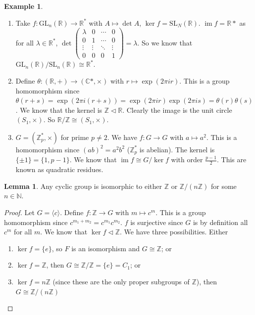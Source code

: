 \documentclass[a4paper]{article}
\theoremstyle{definition}
\newtheorem*{eg}{Example}
\newtheorem*{lemma}{Lemma}
\newcommand{\N}{\mathbb{N}}
\newcommand{\Z}{\mathbb{Z}}
\newcommand{\R}{\mathbb{R}}
\newcommand{\C}{\mathbb{C}}
\newcommand{\bra}{\langle}
\newcommand{\ket}{\rangle}
\newcommand{\GL}{\mathrm{GL}}
\newcommand{\SL}{\mathrm{SL}}
\DeclareMathOperator\im{im}
\begin{document}
\begin{eg}\leavevmode
  \begin{enumerate}
  \item Take $f: \GL_n(\R) \to \R^*$ with $A \mapsto \det A$, $\ker f = \SL_N(\R)$. $\im f = \R*$ as for all $\lambda \in \R^*$, $\det 
    \begin{pmatrix}
      \lambda & 0 & \cdots & 0 \\
      0 &1 & \cdots & 0\\
      \vdots &\vdots &\ddots & \vdots\\
      0& 0 & 0 &1
    \end{pmatrix}
     = \lambda$. So we know that $\GL_n(\R)/\SL_n(\R) \cong \R^*$.
  \item Define $\theta: (\R, +) \to (\C*, \times)$ with $r\mapsto \exp(2\pi ir)$. This is a group homomorphism since $\theta(r + s) = \exp(2\pi i(r + s)) = \exp (2\pi i r)\exp (2\pi i s) = \theta(r)\theta(s)$. We know that the kernel is $\Z\lhd \R$. Clearly the image is the unit circle $(S_1, \times)$. So $\R/\Z \cong (S_1, \times)$.
  \item $G = (\Z_p^*, \times)$ for prime $p\not= 2$. We have $f: G\to G$ with $a\mapsto a^2$. This is a homomorphism since $(ab)^2 = a^2b^2$ ($\Z_p^*$ is abelian). The kernel is $\{\pm 1\} = \{1, p - 1\}$. We know that $\im f\cong G/\ker f$ with order $\frac{p - 1}{2}$. This are known as quadratic residues. 
  \end{enumerate}
\end{eg}

\begin{lemma}
  Any cyclic group is isomorphic to either $\Z$ or $\Z/(n\Z)$ for some $n\in \N$.
\end{lemma}

\begin{proof}
  Let $G = \bra c\ket$. Define $f: \Z \to G$ with $m\mapsto c^m$. This is a group homomorphism since $c^{m_1 + m_2} = c^{m_1}c^{m_2}$. $f$ is surjective since $G$ is by definition all $c^m$ for all $m$. We know that $\ker f\lhd \Z$. We have three possibilities. Either
  \begin{enumerate}
  \item $\ker f = \{e\}$, so $F$ is an isomorphism and $G\cong \Z$; or
  \item $\ker f = \Z$, then $G\cong \Z/\Z = \{e\} = C_1$; or
  \item $\ker f = n\Z$ (since these are the only proper subgroups of $\Z$), then $G\cong \Z/(n\Z)$
  \end{enumerate}
\end{proof}
\end{document}

